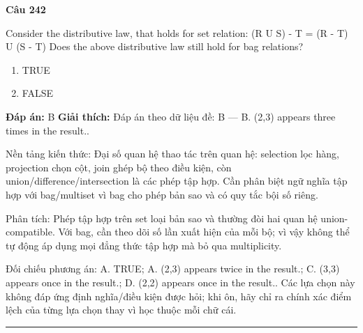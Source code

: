 \documentclass[11pt,a4paper]{article}
\newenvironment{question}[1]{%
  \par\vspace{1em}\noindent\textbf{\large Câu #1}\par\vspace{0.4em}
}{%
  \par\vspace{1em}\hrule\vspace{0.6em}
}
\newenvironment{choices}{%
  \begin{enumerate}[label=\textbf{\Alph*.},leftmargin=2.2em,itemsep=2pt,topsep=3pt]
}{%
  \end{enumerate}
}
\newcommand{\choice}{\item}
\begin{document}
\begin{question}{242}
Consider the distributive law, that holds for set relation:
(R U S) - T = (R - T) U (S - T)
Does the above distributive law still hold for bag relations?
\begin{choices}
\choice TRUE
\choice FALSE
\end{choices}
\textbf{Đáp án:} B
\textbf{Giải thích:} Đáp án theo dữ liệu đề: B — B. (2,3) appears three times in the result..

Nền tảng kiến thức: Đại số quan hệ thao tác trên quan hệ: selection lọc hàng, projection chọn cột, join ghép bộ theo điều kiện, còn union/difference/intersection là các phép tập hợp. Cần phân biệt ngữ nghĩa tập hợp với bag/multiset vì bag cho phép bản sao và có quy tắc bội số riêng.

Phân tích: Phép tập hợp trên set loại bản sao và thường đòi hai quan hệ union-compatible. Với bag, cần theo dõi số lần xuất hiện của mỗi bộ; vì vậy không thể tự động áp dụng mọi đẳng thức tập hợp mà bỏ qua multiplicity.

Đối chiếu phương án: A. TRUE; A. (2,3) appears twice in the result.; C. (3,3) appears once in the result.; D. (2,2) appears once in the result.. Các lựa chọn này không đáp ứng định nghĩa/điều kiện được hỏi; khi ôn, hãy chỉ ra chính xác điểm lệch của từng lựa chọn thay vì học thuộc mỗi chữ cái.
\end{question}
\end{document}
